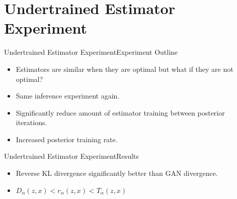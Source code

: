 \documentclass{beamer}
\begin{document}
\section{Undertrained Estimator Experiment}
\begin{frame}{Undertrained Estimator Experiment}{Experiment Outline}
\begin{itemize}
\item Estimators are similar when they are optimal but what if they are not optimal?
\item Same inference experiment again.
\item Significantly reduce amount of estimator training between posterior iterations.
\item Increased posterior training rate.
\end{itemize}
\end{frame}
\begin{frame}{Undertrained Estimator Experiment}{Results}
\begin{table}[h]
\end{table}
\begin{itemize}
\item Reverse KL divergence significantly better than GAN divergence.
\item $D_\alpha(z,x)<r_\alpha(z,x)<T_\alpha(z,x)$
\end{itemize}
\end{frame}
\end{document}
